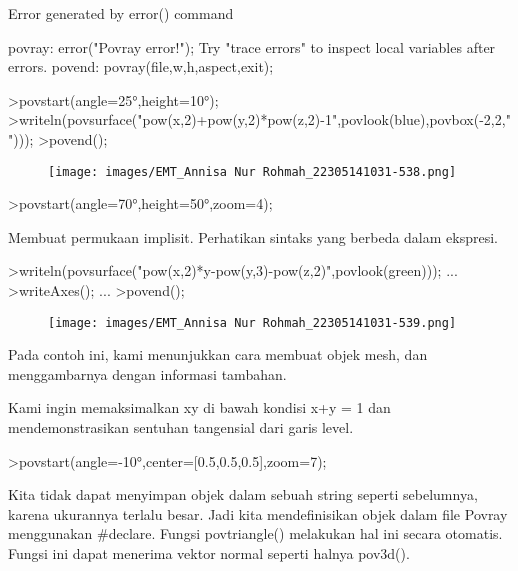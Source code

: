 \documentclass[a4paper,10pt]{article}
\begin{document}
\begin{eulernotebook}
\begin{euleroutput}
  Error generated by error() command
  
  povray:
      error("Povray error!");
  Try "trace errors" to inspect local variables after errors.
  povend:
      povray(file,w,h,aspect,exit); 
\end{euleroutput}
\begin{eulerprompt}
>povstart(angle=25°,height=10°); 
>writeln(povsurface("pow(x,2)+pow(y,2)*pow(z,2)-1",povlook(blue),povbox(-2,2,"")));
>povend();
\end{eulerprompt}
\begin{figure}[h]
    \centering
    \texttt{[image: images/EMT\_Annisa Nur Rohmah\_22305141031-538.png]}
\end{figure}
\begin{eulerprompt}
>povstart(angle=70°,height=50°,zoom=4);
\end{eulerprompt}
\begin{eulercomment}
Membuat permukaan implisit. Perhatikan sintaks yang berbeda dalam
ekspresi.
\end{eulercomment}
\begin{eulerprompt}
>writeln(povsurface("pow(x,2)*y-pow(y,3)-pow(z,2)",povlook(green))); ...
>writeAxes(); ...
>povend();
\end{eulerprompt}
\begin{figure}[h]
    \centering
    \texttt{[image: images/EMT\_Annisa Nur Rohmah\_22305141031-539.png]}
\end{figure}
\begin{eulercomment}
Pada contoh ini, kami menunjukkan cara membuat objek mesh, dan
menggambarnya dengan informasi tambahan.

Kami ingin memaksimalkan xy di bawah kondisi x+y = 1 dan
mendemonstrasikan sentuhan tangensial dari garis level.
\end{eulercomment}
\begin{eulerprompt}
>povstart(angle=-10°,center=[0.5,0.5,0.5],zoom=7);
\end{eulerprompt}
\begin{eulercomment}
Kita tidak dapat menyimpan objek dalam sebuah string seperti
sebelumnya, karena ukurannya terlalu besar. Jadi kita mendefinisikan
objek dalam file Povray menggunakan #declare. Fungsi povtriangle()
melakukan hal ini secara otomatis. Fungsi ini dapat menerima vektor
normal seperti halnya pov3d().


\end{eulercomment}
\end{eulernotebook}
\end{document}
